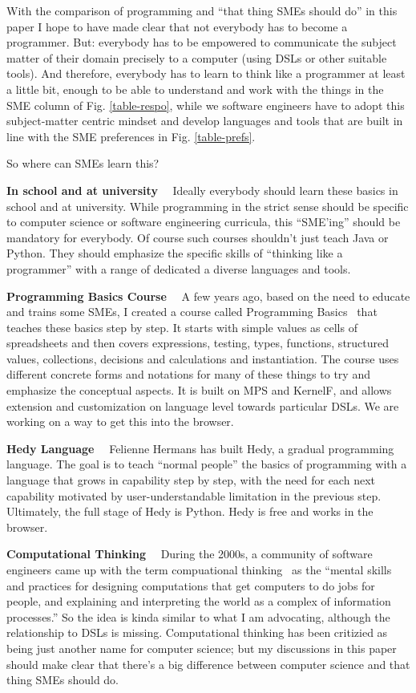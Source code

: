 \documentclass[runningheads]{llncs}
\newcommand\parhead[1]{\vspace{1mm}\noindent\textbf{{#1}}\ \ }
\newcommand{\fig}[1]{Fig. \ref{#1}}  %
\begin{document}
With the comparison of programming and ``that thing SMEs should do'' in this
paper I hope to have made clear that not everybody has to become a programmer.
But: everybody has to be empowered to communicate the subject matter of their
domain precisely to a computer (using DSLs or other suitable tools). And
therefore, everybody has to learn to think like a programmer at least a little
bit, enough to be able to understand and work with the things in the SME column
of \fig{table-respo}, while we software engineers have to adopt this
subject-matter centric mindset and develop languages and tools that are built in
line with the SME preferences in \fig{table-prefs}. 

\noindent So where can SMEs learn this? 

\parhead{In school and at university} Ideally
everybody should learn these basics in school and at university. While
programming in the strict sense should be specific to computer science or
software engineering curricula, this ``SME'ing'' should be mandatory for
everybody. Of course such courses shouldn't just teach Java or Python. They
should emphasize the specific skills of ``thinking like a programmer'' with a
range of dedicated a diverse languages and tools.

\parhead{Programming Basics Course} A few years ago, based on the need to educate and
trains some SMEs, I created a course called Programming Basics~\cite{voelterProgBas} that teaches
these basics step by step. It starts with simple values as cells of spreadsheets
and then covers expressions, testing, types, functions, structured values,
collections, decisions and calculations and instantiation. The course uses
different concrete forms and notations for many of these things to try and
emphasize the conceptual aspects. It is built on MPS and KernelF, and allows
extension and customization on language level towards particular DSLs. We are
working on a way to get this into the browser.


\parhead{Hedy Language} Felienne Hermans has built Hedy, a gradual programming 
language. The goal is to teach ``normal people'' the basics of programming
with a language that grows in capability step by step, with the need for
each next capability motivated by user-understandable limitation in the
previous step. Ultimately, the full stage of Hedy is Python. Hedy is free
and works in the browser. 



\parhead{Computational Thinking} During the 2000s, a community of software
engineers came up with the term compuational thinking~\cite{denning2019computational} as the ``mental skills and
practices for designing computations that get computers to do jobs for people,
and explaining and interpreting the world as a complex of information
processes.''
So the idea is kinda similar to what I am advocating, although the relationship
to DSLs is missing. Computational thinking has been critizied as being just
another name for computer science; but my discussions in this paper should make
clear that there's a big difference between computer science and that thing SMEs
should do.
\end{document}
